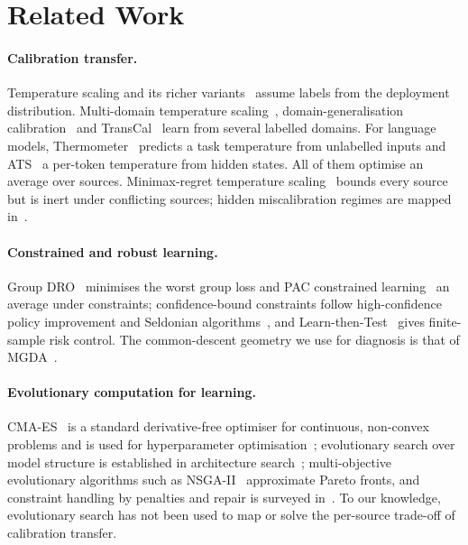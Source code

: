 \documentclass[runningheads]{llncs}
\begin{document}
\section{Related Work}
\paragraph{Calibration transfer.}
Temperature scaling and its richer variants~\cite{guo2017calibration,balanya2024adaptive,rahimi2020intra,zhang2020mixnmatch,lecoz2024tva} assume labels from the deployment distribution.
Multi-domain temperature scaling~\cite{yu2022multidomain}, domain-generalisation calibration~\cite{gong2021dgcal,choi2024cts} and TransCal~\cite{wang2020transcal} learn from several labelled domains.
For language models, Thermometer~\cite{shen2024thermometer} predicts a task temperature from unlabelled inputs and ATS~\cite{xie2024ats} a per-token temperature from hidden states.
All of them optimise an average over sources.
Minimax-regret temperature scaling~\cite{calport2026} bounds every source but is inert under conflicting sources; hidden miscalibration regimes are mapped in~\cite{kobalczyk2026hidden}.
\paragraph{Constrained and robust learning.}
Group DRO~\cite{sagawa2020dro} minimises the worst group loss and PAC constrained learning~\cite{chamon2020pac} an average under constraints; confidence-bound constraints follow high-confidence policy improvement and Seldonian algorithms~\cite{thomas2015hcpi,thomas2019seldonian}, and Learn-then-Test~\cite{angelopoulos2021ltt} gives finite-sample risk control.
The common-descent geometry we use for diagnosis is that of MGDA~\cite{desideri2012mgda,sener2018mtl,liu2021cagrad}.
\paragraph{Evolutionary computation for learning.}
CMA-ES~\cite{hansen2001cma,hansen2016tutorial} is a standard derivative-free optimiser for continuous, non-convex problems and is used for hyperparameter optimisation~\cite{loshchilov2016cmahpo}; evolutionary search over model structure is established in architecture search~\cite{real2019regularized}; multi-objective evolutionary algorithms such as NSGA-II~\cite{deb2002nsga2} approximate Pareto fronts, and constraint handling by penalties and repair is surveyed in~\cite{coello2002constraint}.
To our knowledge, evolutionary search has not been used to map or solve the per-source trade-off of calibration transfer.
\end{document}
